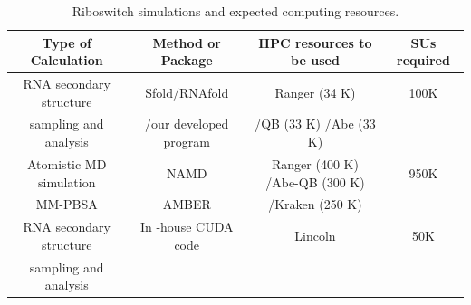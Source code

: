 \documentclass[a4paper,10pt]{article}
\newcommand{\up}{\vspace*{-1em}}
\begin{document}







\begin{table}[h]
\up
\begin{center}
  \caption{Riboswitch simulations and expected computing resources.  }
\label{table:systems}
\begin{tabular}{| c | c | c | c |}
\hline
Type of Calculation &   Method or Package  &    HPC resources to be used & SUs required \\
\hline \hline
RNA secondary structure &
Sfold/RNAfold& Ranger (34 K) & 100K\\ 
sampling and analysis  & /our developed program  & /QB (33 K) /Abe (33 K) & \\  \hline
Atomistic MD simulation & NAMD  & Ranger (400 K) /Abe-QB (300 K)  & 950K \\  
MM-PBSA        & AMBER    & /Kraken (250 K) &  \\ \hline
RNA secondary structure & In -house CUDA code & Lincoln & 50K \\
 sampling and analysis &   
&  &  \\
\hline
\end{tabular}
\up\up
\end{center}

\end{table}
\end{document}
